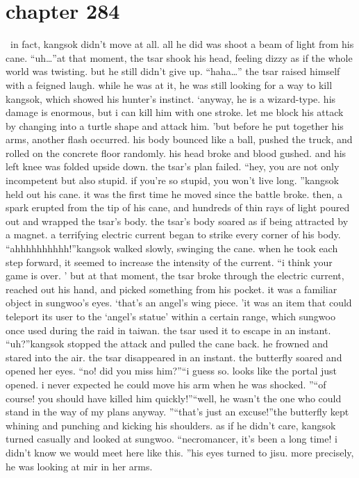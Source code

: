 \section{chapter 284}






 in fact, kangsok didn’t move at all.
 all he did was shoot a beam of light from his cane.
“uh…”at that moment, the tsar shook his head, feeling dizzy as if the whole world was twisting.
but he still didn’t give up.
“haha…” the tsar raised himself with a feigned laugh.
 while he was at it, he was still looking for a way to kill kangsok, which showed his hunter’s instinct.
‘anyway, he is a wizard-type.
 his damage is enormous, but i can kill him with one stroke.
 let me block his attack by changing into a turtle shape and attack him.
’but before he put together his arms, another flash occurred.
his body bounced like a ball, pushed the truck, and rolled on the concrete floor randomly.
 his head broke and blood gushed.
 and his left knee was folded upside down.
the tsar’s plan failed.
“hey, you are not only incompetent but also stupid.
 if you’re so stupid, you won’t live long.
”kangsok held out his cane.
 it was the first time he moved since the battle broke.
then, a spark erupted from the tip of his cane, and hundreds of thin rays of light poured out and wrapped the tsar’s body.
the tsar’s body soared as if being attracted by a magnet.
 a terrifying electric current began to strike every corner of his body.
“ahhhhhhhhhh!”kangsok walked slowly, swinging the cane.
 when he took each step forward, it seemed to increase the intensity of the current.
“i think your game is over.
’
but at that moment, the tsar broke through the electric current, reached out his hand, and picked something from his pocket.
 it was a familiar object in sungwoo’s eyes.
‘that’s an angel’s wing piece.
’it was an item that could teleport its user to the ‘angel’s statue’ within a certain range, which sungwoo once used during the raid in taiwan.
the tsar used it to escape in an instant.
“uh?”kangsok stopped the attack and pulled the cane back.
 he frowned and stared into the air.
the tsar disappeared in an instant.
the butterfly soared and opened her eyes.
“no! did you miss him?”“i guess so.
 looks like the portal just opened.
 i never expected he could move his arm when he was shocked.
”“of course! you should have killed him quickly!”“well, he wasn’t the one who could stand in the way of my plans anyway.
”“that’s just an excuse!”the butterfly kept whining and punching and kicking his shoulders.
as if he didn’t care, kangsok turned casually and looked at sungwoo.
“necromancer, it’s been a long time! i didn’t know we would meet here like this.
”his eyes turned to jisu.
 more precisely, he was looking at mir in her arms.

